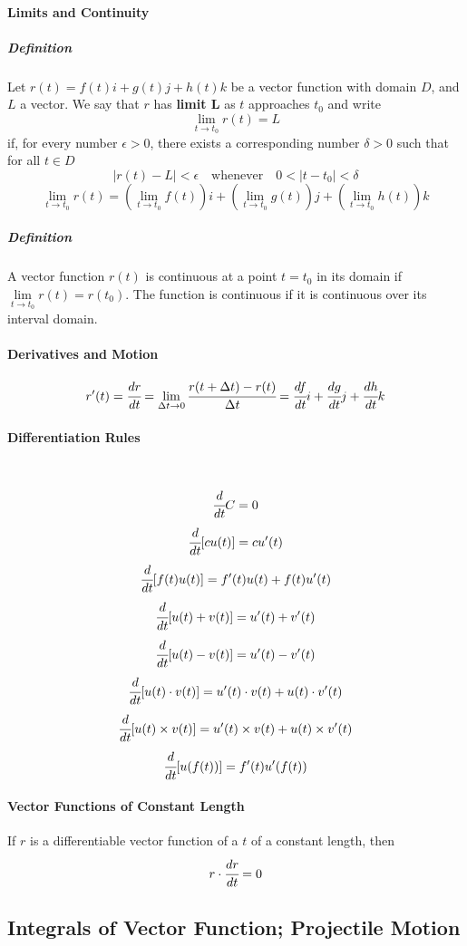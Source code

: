 \documentclass{article}
\begin{document}
            \paragraph{Limits and Continuity}
                \subparagraph{Definition}
                    Let $r(t)=f(t)i+g(t)j+h(t)k$ be a vector function with domain $D$, and $L$ a vector. We say that $r$ has \textbf{limit L} as $t$ approaches $t_0$ and write
                    \[\lim\limits_{t\to t_0}r(t)=L\]
                    if, for every number $\epsilon>0$, there exists a corresponding number $\delta>0$ such that for all $t\in D$
                    \[|r(t)-L|<\epsilon\quad \text{whenever}\quad 0<|t-t_0|<\delta\]
                    \[\lim\limits_{t\to t_0}r(t)=(\lim\limits_{t\to t_0}f(t))i+(\lim\limits_{t\to t_0}g(t))j+(\lim\limits_{t\to t_0}h(t))k\]
                \subparagraph{Definition} A vector function $r(t)$ is continuous at a point $t=t_0$ in its domain if $\lim\limits_{t\to t_0} r(t)=r(t_0)$. The function is continuous if it is continuous over its interval domain.
            \paragraph{Derivatives and Motion}
                \[r'(t)=\cfrac{dr}{dt}=\lim\limits_{\Delta t\to 0}\cfrac{r(t+\Delta t)-r(t)}{\Delta t}=\cfrac{df}{dt}i+\cfrac{dg}{dt}j+\cfrac{dh}{dt}k\]
            \paragraph{Differentiation Rules}
                \text{}\\
                \[\cfrac{d}{dt}C=0\]
                \[\cfrac{d}{dt}[cu(t)]=cu'(t)\]
                \[\cfrac{d}{dt}[f(t)u(t)]=f'(t)u(t)+f(t)u'(t)\]
                \[\cfrac{d}{dt}[u(t)+v(t)]=u'(t)+v'(t)\]
                \[\cfrac{d}{dt}[u(t)-v(t)]=u'(t)-v'(t)\]
                \[\cfrac{d}{dt}[u(t)\cdot v(t)]=u'(t)\cdot v(t)+u(t)\cdot v'(t)\]
                \[\cfrac{d}{dt}[u(t)\times v(t)]=u'(t)\times v(t)+u(t)\times v'(t)\]
                \[\cfrac{d}{dt}[u(f(t))]=f'(t)u'(f(t))\]
            \paragraph{Vector Functions of Constant Length}
                If $r$ is a differentiable vector function of a $t$ of a constant length, then
                \[r\cdot\cfrac{dr}{dt}=0\]
        \subsection{Integrals of Vector Function; Projectile Motion}
\end{document}

